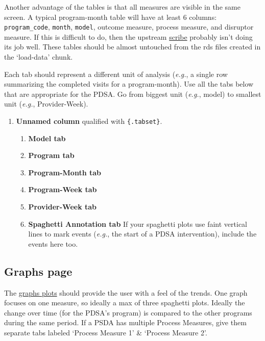 \documentclass[
]{book}
\providecommand{\tightlist}{%
  \setlength{\itemsep}{0pt}\setlength{\parskip}{0pt}}
\begin{document}
Another advantage of the tables is that all measures are visible in the same screen. A typical program-month table will have at least 6 columns: \texttt{program\_code}, \texttt{month}, \texttt{model}, outcome measure, process measure, and disruptor measure. If this is difficult to do, then the upstream \protect\hyperlink{pattern-scribe}{scribe} probably isn't doing its job well. These tables should be almost untouched from the rds files created in the `load-data' chunk.

Each tab should represent a different unit of analysis (\emph{e.g.}, a single row summarizing the completed visits for a program-month). Use all the tabs below that are appropriate for the PDSA. Go from biggest unit (\emph{e.g.}, model) to smallest unit (\emph{e.g.}, Provider-Week).

\begin{enumerate}
\def\labelenumi{\arabic{enumi}.}
\item
  \textbf{Unnamed column} qualified with \texttt{\{.tabset\}}.

  \begin{enumerate}
  \def\labelenumii{\arabic{enumii}.}
  \tightlist
  \item
    \textbf{Model tab}
  \item
    \textbf{Program tab}
  \item
    \textbf{Program-Month tab}
  \item
    \textbf{Program-Week tab}
  \item
    \textbf{Provider-Week tab}
  \item
    \textbf{Spaghetti Annotation tab} If your spaghetti plots use faint vertical lines to mark events (\emph{e.g.}, the start of a PDSA intervention), include the events here too.
  \end{enumerate}
\end{enumerate}

\hypertarget{graphs-page}{%
\subsection{Graphs page}\label{graphs-page}}

The \href{https://ouhscbbmc.github.io/data-science-practices-1/dashboard-1.html\#graphs}{graphs plots} should provide the user with a feel of the trends. One graph focuses on one measure, so ideally a max of three spaghetti plots. Ideally the change over time (for the PDSA's program) is compared to the other programs during the same period. If a PSDA has multiple Process Measures, give them separate tabs labeled `Process Measure 1' \& `Process Measure 2'.
\end{document}
